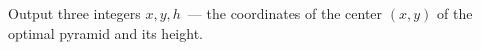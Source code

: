 Output three integers $x, y, h$~--- the coordinates of the center $(x, y)$ of the optimal pyramid and its height.